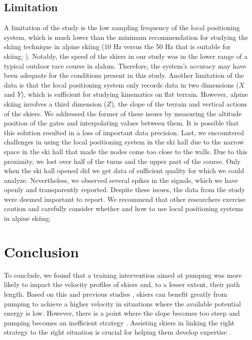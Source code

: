 \documentclass{article}
\begin{document}
\subsection{Limitation}
A limitation of the study is the low sampling frequency of the local positioning system, which is much lower than the minimum recommendation for studying the skiing technique in alpine skiing (10 Hz versus the 50 Hz that is suitable for skiing;   \cite{federolf_quantifying_2012}). Notably, the speed of the skiers in our study was in the lower range of a typical outdoor race course in slalom. Therefore, the system's accuracy may have been adequate for the conditions present in this study. Another limitation of the data is that the local positioning system only records data in two dimensions ($X$ and $Y$), which is sufficient for studying kinematics on flat terrain. However, alpine skiing involves a third dimension ($Z$), the slope of the terrain and vertical actions of the skiers. We addressed the former of these issues by measuring the altitude position of the gates and interpolating values between them. It is possible that this solution resulted in a loss of important data precision. Last, we encountered challenges in using the local positioning system in the ski hall due to the narrow space in the ski hall that made the nodes come too close to the walls. Due to this proximity, we lost over half of the turns and the upper part of the course. Only when the ski hall opened did we get data of sufficient quality for which we could analyze. Nevertheless, we observed several spikes in the signals, which we have openly and transparently reported. Despite these issues, the data from the study were deemed important to report.  We recommend that other researchers exercise caution and carefully consider whether and how to use local positioning systems in alpine skiing.

\section{Conclusion}
To conclude, we found that a training intervention aimed at pumping was more likely to impact the velocity profiles of skiers and, to a lesser extent, their path length. Based on this and previous studies \cite{christian_magelssen_reinforcement_2024}, skiers can benefit greatly from pumping to achieve a higher velocity in situations where the available potential energy is low. However, there is a point where the slope becomes too steep and pumping becomes an inefficient strategy \cite{supej_impact_2015}. Assisting skiers in linking the right strategy to the right situation is crucial for helping them develop expertise \cite{krakauer_motor_2019}.
\end{document}

